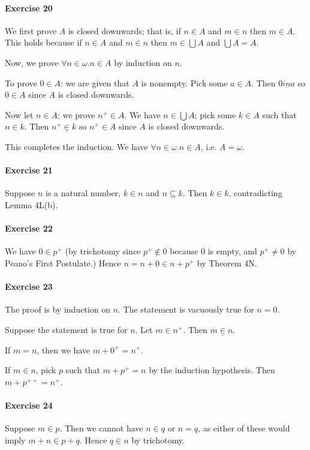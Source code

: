 \documentclass{report}
\begin{document}
    \paragraph{Exercise 20}
    We first prove $A$ is closed downwards; that is, if $n \in A$ and $m \in n$ then $m \in A$. This holds
    because if $n \in A$ and $m \in n$ then $m \in \bigcup A$ and $\bigcup A = A$.

    Now, we prove $\forall n \in \omega. n \in A$ by induction on $n$.

    To prove $0 \in A$: we are given that $A$ is nonempty. Pick some $a \in A$. Then $0 \underline{in} a$
    so $0 \in A$ since $A$ is closed downwards.

    Now let $n \in A$; we prove $n^+ \in A$. We have $n \in \bigcup A$; pick some $k \in A$ such that $n \in k$.
    Then $n^+ \underline{\in} k$ so $n^+ \in A$ since $A$ is closed downwards.

    This completes the induction. We have $\forall n \in \omega. n \in A$, i.e. $A = \omega$.

    \paragraph{Exercise 21}
    Suppose $n$ is a natural number, $k \in n$ and $n \subseteq k$. Then $k \in k$, contradicting
    Lemma 4L(b).

    \paragraph{Exercise 22}
    We have $0 \in p^+$ (by trichotomy since $p^+ \notin 0$ because 0 is empty, and $p^+ \neq 0$ by Peano's
    First Postulate.) Hence $n = n + 0 \in n + p^+$ by Theorem 4N.

    \paragraph{Exercise 23}
    The proof is by induction on $n$. The statement is vacuously true for $n = 0$.

    Suppose the statement is true for $n$. Let $m \in n^+$. Then $m \underline{\in} n$.

    If $m = n$, then we have $m + 0^+ = n^+$.

    If $m \in n$, pick $p$ such that $m + p^+ = n$ by the induction hypothesis. Then $m + p^{++} = n^+$.

    \paragraph{Exercise 24}
    Suppose $m \in p$. Then we cannot have $n \in q$ or $n = q$, as either of these would imply
    $m + n \in p + q$. Hence $q \in n$ by trichotomy.
\end{document}
